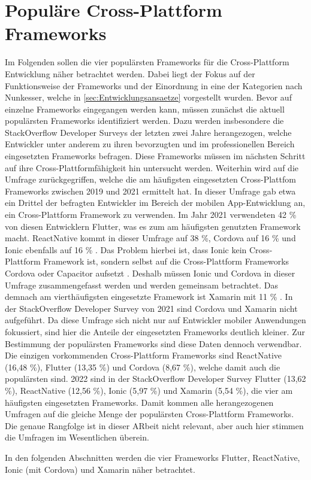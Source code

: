 \chapter{Populäre Cross-Plattform Frameworks}
\label{ch:Frameworks}

Im Folgenden sollen die vier populärsten Frameworks für die Cross-Plattform Entwicklung näher betrachtet werden.
Dabei liegt der Fokus auf der Funktionsweise der Frameworks und der Einordnung in eine der Kategorien nach Nunkesser, welche in \autoref{sec:Entwicklungsansaetze} vorgestellt wurden.
Bevor auf einzelne Frameworks eingegangen werden kann, müssen zunächst die aktuell populärsten Frameworks identifiziert werden.
Dazu werden insbesondere die StackOverflow Developer Surveys \cite{Stackoverflow_2021} \cite{Stackoverflow_2022} der letzten zwei Jahre herangezogen, welche Entwickler unter anderem zu ihren bevorzugten und im professionellen Bereich eingesetzten Frameworks befragen.
Diese Frameworks müssen im nächsten Schritt auf ihre Cross-Plattformfähigkeit hin untersucht werden.
Weiterhin wird auf die Umfrage \cite{Statista_UsedCrossPlatformFrameworks} zurückgegriffen, welche die am häufigsten eingesetzten Cross-Plattfom Frameworks zwischen 2019 und 2021 ermittelt hat.
In dieser Umfrage gab etwa ein Drittel der befragten Entwickler im Bereich der mobilen App-Entwicklung an, ein Cross-Plattform Framework zu verwenden.
Im Jahr 2021 verwendeten 42 \% von diesen Entwicklern Flutter, was es zum am häufigsten genutzten Framework macht.
ReactNative kommt in dieser Umfrage auf 38 \%, Cordova auf 16 \% und Ionic ebenfalls auf 16 \% \cite{Statista_UsedCrossPlatformFrameworks}.
Das Problem hierbei ist, dass Ionic kein Cross-Plattform Framework ist, sondern selbst auf die Cross-Plattform Frameworks Cordova oder Capacitor aufsetzt \cite{Ionic_Docs}.
Deshalb müssen Ionic und Cordova in dieser Umfrage zusammengefasst werden und werden gemeinsam betrachtet.
Das demnach am vierthäufigsten eingesetzte Framework ist Xamarin mit 11 \% \cite{Statista_UsedCrossPlatformFrameworks}.
In der StackOverflow Developer Survey von 2021 \cite{Stackoverflow_2021} sind Cordova und Xamarin nicht aufgeführt.
Da diese Umfrage sich nicht nur auf Entwickler mobiler Anwendungen fokussiert, sind hier die Anteile der eingesetzten Frameworks deutlich kleiner.
Zur Bestimmung der populärsten Frameworks sind diese Daten dennoch verwendbar.
Die einzigen vorkommenden Cross-Plattform Frameworks sind ReactNative (16,48 \%), Flutter (13,35 \%) und Cordova (8,67 \%), welche damit auch die populärsten sind.
2022 sind in der StackOverflow Developer Survey \cite{Stackoverflow_2022} Flutter (13,62 \%), ReactNative (12,56 \%), Ionic (5,97 \%) und Xamarin (5,54 \%), die vier am häufigsten eingesetzten Frameworks.
Damit kommen alle herangezogenen Umfragen auf die gleiche Menge der populärsten Cross-Plattform Frameworks.
Die genaue Rangfolge ist in dieser ARbeit nicht relevant, aber auch hier stimmen die Umfragen im Wesentlichen überein.

In den folgenden Abschnitten werden die vier Frameworks Flutter, ReactNative, Ionic (mit Cordova) und Xamarin näher betrachtet.




